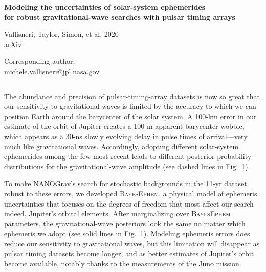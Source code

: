 \documentclass[main.tex]{subfiles}
\begin{document}
\begin{center}
{\Large \bf{Modeling the uncertainties of solar-system ephemerides\\
for robust gravitational-wave searches with pulsar timing arrays}}\\
\end{center}

\begin{multicols}{2}
Vallisneri, Taylor, Simon, et al. 2020\\
arXiv:

Corresponding author:\\
\href{mailto:michele.vallisneri@jpl.nasa.gov}{michele.vallisneri@jpl.nasa.gov}

\end{multicols}

\vspace{-3ex}

\rule{\textwidth}{1pt}

\setlength\intextsep{0pt} %
\setlength{\columnsep}{10pt} %


The abundance and precision of pulsar-timing-array datasets is now so great that our sensitivity to gravitational waves is limited by the accuracy to which we can position Earth around the barycenter of the solar system. A 100-km error in our estimate of the orbit of Jupiter creates a 100-m apparent barycenter wobble, which appears as a 30-ns slowly evolving delay in pulse times of arrival---very much like gravitational waves. Accordingly, adopting different solar-system ephemerides among the few most recent leads to different posterior probability distributions for the gravitational-wave amplitude (see dashed lines in Fig.\ 1).

To make NANOGrav's search for stochastic backgrounds in the 11-yr dataset robust to these errors, we developed \textsc{BayesEphem}, a physical model of ephemeris uncertainties that focuses on the degrees of freedom that most affect our search---indeed, Jupiter's orbital elements. After marginalizing over \textsc{BayesEphem} parameters, the gravitational-wave posteriors look the same no matter which ephemeris we adopt (see solid lines in Fig.\ 1). Modeling ephemeris errors does reduce our sensitivity to gravitational waves, but this limitation will disappear as pulsar timing datasets become longer, and as better estimates of Jupiter's orbit become available, notably thanks to the measurements of the Juno mission.
\end{document}

